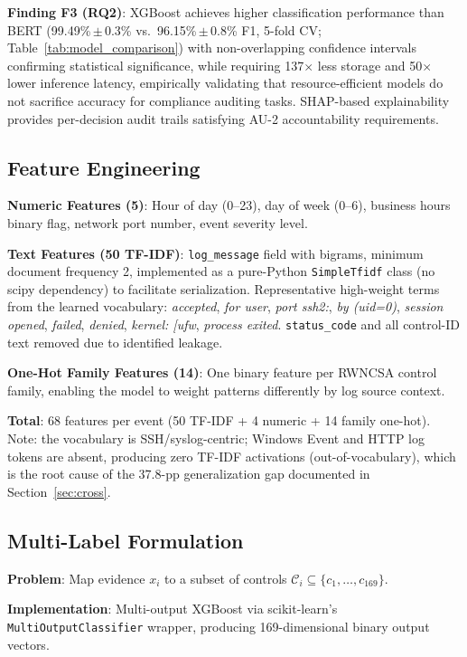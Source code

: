\documentclass[futureinternet,article,submit,pdftex,moreauthors]{Definitions/mdpi}
\begin{document}
\textbf{Finding F3 (RQ2)}: XGBoost achieves higher classification performance than BERT
(99.49\%\,$\pm$\,0.3\% vs.\ 96.15\%\,$\pm$\,0.8\% F1, 5-fold CV;
Table~\ref{tab:model_comparison}) with non-overlapping confidence intervals confirming
statistical significance, while requiring 137$\times$ less storage and 50$\times$ lower
inference latency, empirically validating that resource-efficient models do not sacrifice
accuracy for compliance auditing tasks. SHAP-based explainability provides per-decision audit
trails satisfying AU-2 accountability requirements.

\subsection{Feature Engineering}

\textbf{Numeric Features (5)}: Hour of day (0--23), day of week (0--6), business hours
binary flag, network port number, event severity level.

\textbf{Text Features (50 TF-IDF)}: \texttt{log\_message} field with bigrams,
minimum document frequency 2, implemented as a pure-Python \texttt{SimpleTfidf} class (no
scipy dependency) to facilitate serialization. Representative high-weight terms from the
learned vocabulary: \textit{accepted}, \textit{for user}, \textit{port ssh2:},
\textit{by (uid=0)}, \textit{session opened}, \textit{failed}, \textit{denied},
\textit{kernel: [ufw}, \textit{process exited}. \texttt{status\_code} and all control-ID
text removed due to identified leakage.

\textbf{One-Hot Family Features (14)}: One binary feature per RWNCSA control family,
enabling the model to weight patterns differently by log source context.

\textbf{Total}: 68 features per event (50 TF-IDF + 4 numeric + 14 family one-hot).
Note: the vocabulary is SSH/syslog-centric; Windows Event and HTTP log tokens are absent,
producing zero TF-IDF activations (out-of-vocabulary), which is the root cause of the
37.8-pp generalization gap documented in Section~\ref{sec:cross}.

\subsection{Multi-Label Formulation}

\textbf{Problem}: Map evidence $x_i$ to a subset of controls
$\mathcal{C}_i \subseteq \{c_1, \ldots, c_{169}\}$.

\textbf{Implementation}: Multi-output XGBoost via scikit-learn's
\texttt{MultiOutputClassifier} wrapper, producing 169-dimensional binary output vectors.
\end{document}

